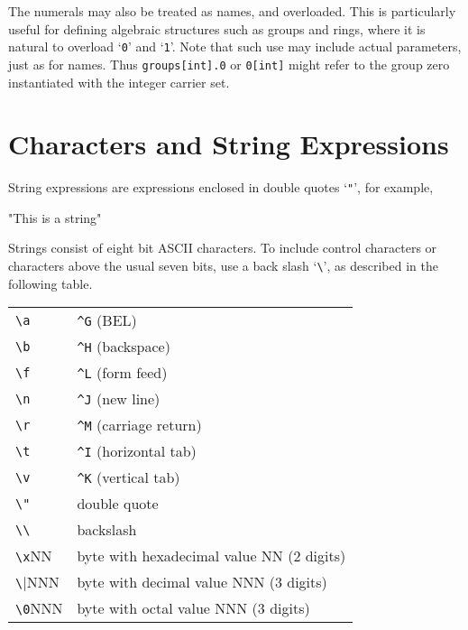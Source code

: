 The numerals may also be treated as names, and
overloaded. This
is particularly useful for defining algebraic structures such as groups
and rings, where it is natural to overload `\texttt{0}' and `\texttt{1}'.
Note that such use may include actual parameters, just as for names.  Thus
\texttt{groups[int].0} or \texttt{0[int]} might refer to the group zero
instantiated with the integer carrier set.

\section{Characters and String Expressions}

String expressions are expressions enclosed in double quotes `\texttt{"}',
for example,
\begin{pvsex}
  "This is a string"
\end{pvsex}
Strings consist of eight bit ASCII characters.  To include control
characters or characters above the usual seven bits, use a back slash
`\verb|\|', as described in the following table.

\begin{tabular}{ll}
\verb|\a| & \verb|^G| (BEL) \\
\verb|\b| & \verb|^H| (backspace) \\
\verb|\f| & \verb|^L| (form feed) \\
\verb|\n| & \verb|^J| (new line) \\
\verb|\r| & \verb|^M| (carriage return) \\
\verb|\t| & \verb|^I| (horizontal tab) \\
\verb|\v| & \verb|^K| (vertical tab) \\
\verb|\"| & double quote \\
\verb|\\| & backslash \\
\verb|\x|NN & byte with hexadecimal value NN (2 digits) \\
\verb|\|NNN & byte with decimal value NNN (3 digits) \\
\verb|\0|NNN & byte with octal value NNN (3 digits) \\
\end{tabular}

